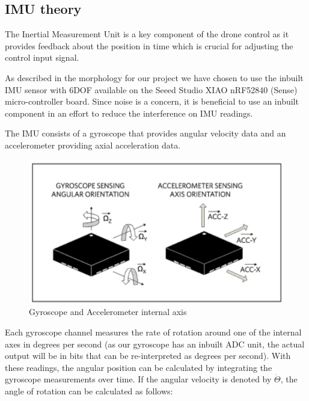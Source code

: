 \subsection{IMU theory}

The Inertial Measurement Unit is a key component of the drone control as it provides feedback about the position in time which is crucial for adjusting the control input signal.

As described in the morphology for our project we have chosen to use the inbuilt IMU sensor with 6DOF available on the Seeed Studio XIAO nRF52840 (Sense) micro-controller board. Since noise is a concern, it is beneficial to use an inbuilt component in an effort to reduce the interference on IMU readings.

The IMU consists of a gyroscope that provides angular velocity
data and an accelerometer providing axial acceleration data.

\begin{figure}[H]
    \begin{center}
    \includegraphics[scale = 0.5]{pictures/IMU/Gyro.png}
    \end{center}
    \caption{Gyroscope and Accelerometer internal axis }
    \label{fig:my_label}
\end{figure}


Each gyroscope channel measures the rate of rotation around one of the internal axes in degrees per second (as our gyroscope has an inbuilt ADC unit, the actual output will be in bits that can be re-interpreted as degrees per second). With these readings, the angular position can be calculated by integrating the gyroscope measurements over time. If the angular velocity is denoted by $\dot{\Theta}$, the angle of rotation can be calculated as follows:

